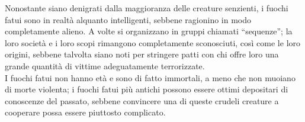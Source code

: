 \begin{multicols}{2}
Nonostante siano denigrati dalla maggioranza delle creature senzienti, i fuochi fatui sono in realtà alquanto intelligenti, sebbene ragionino in modo completamente alieno. A volte si organizzano in gruppi chiamati “sequenze”; la loro società e i loro scopi rimangono completamente sconosciuti, così come le loro origini, sebbene talvolta siano noti per stringere patti con chi offre loro una grande quantità di vittime adeguatamente terrorizzate.\\

I fuochi fatui non hanno età e sono di fatto immortali, a meno che non muoiano di morte violenta; i fuochi fatui più antichi possono essere ottimi depositari di conoscenze del passato, sebbene convincere una di queste crudeli creature a cooperare possa essere piuttosto complicato.\\


\end{multicols}
